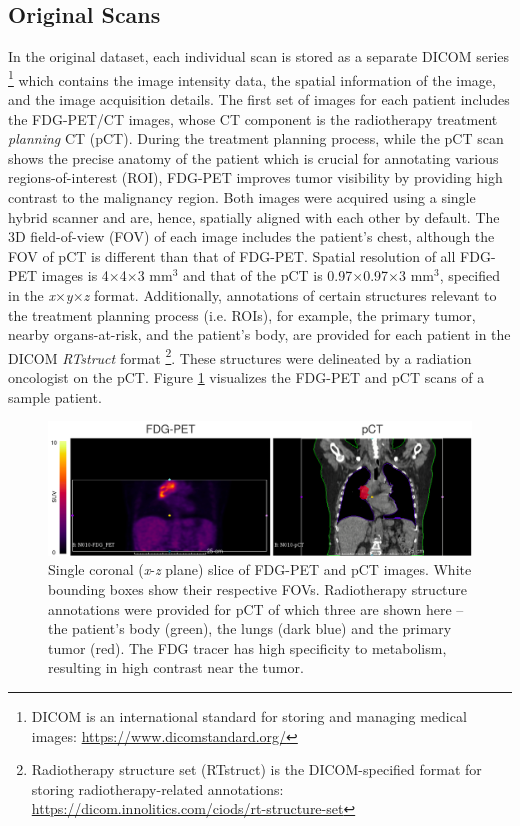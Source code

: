 \subsection{Original Scans}
\label{Original_Scans}
In the original dataset, each individual scan is stored as a separate DICOM series \footnote{DICOM is an international standard for storing and managing medical images: \url{https://www.dicomstandard.org/}} which contains the image intensity data, the spatial information of the image, and the image acquisition details. The first set of images for each patient includes the FDG-PET/CT images, whose CT component is the radiotherapy treatment \textit{planning} CT (pCT). During the treatment planning process, while the pCT scan shows the precise anatomy of the patient which is crucial for annotating various regions-of-interest (ROI), FDG-PET improves tumor visibility by providing high contrast to the malignancy region. Both images were acquired using a single hybrid scanner and are, hence, spatially aligned with each other by default. The 3D field-of-view (FOV) of each image includes the patient's chest, although the FOV of pCT is different than that of FDG-PET. Spatial resolution of all FDG-PET images is 4$\times$4$\times$3 mm$^3$ and that of the pCT is 0.97$\times$0.97$\times$3 mm$^3$, specified in the \textit{x}$\times$\textit{y}$\times$\textit{z} format. Additionally, annotations of certain structures relevant to the treatment planning process (i.e. ROIs), for example, the primary tumor, nearby organs-at-risk, and the patient's body, are provided for each patient in the DICOM \textit{RTstruct} format \footnote{Radiotherapy structure set (RTstruct) is the DICOM-specified format for storing radiotherapy-related annotations: \url{https://dicom.innolitics.com/ciods/rt-structure-set}}. These structures were delineated by a radiation oncologist on the pCT. Figure \ref{fig:original_fdgpet_pct} visualizes the FDG-PET and pCT scans of a sample patient.

\begin{figure}[h!]
    \centering
    \includegraphics[width=\linewidth]{figures/Data/original/N010-FDG_PET_pCT.png}
    \caption{Single coronal (\textit{x}-\textit{z} plane) slice of FDG-PET and pCT images. White bounding boxes show their respective FOVs. Radiotherapy structure annotations were provided for pCT of which three are shown here -- the patient's body (green), the lungs (dark blue) and the primary tumor (red). The FDG tracer has high specificity to metabolism, resulting in high contrast near the tumor.}
    \label{fig:original_fdgpet_pct}
\end{figure}

